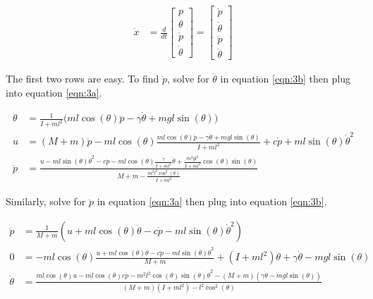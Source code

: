 \documentclass[11pt]{article}
\theoremstyle{definition}
\begin{document}
\begin{enumerate}
\begin{enumerate}
        \begin{align}
            \dot{x} &= \frac{d}{dt}\begin{bmatrix} p \\ \theta \\ \dot{p} \\ \dot{\theta} \end{bmatrix} = \begin{bmatrix} \dot{p} \\ \dot{\theta} \\ \ddot{p} \\ \ddot{\theta} \end{bmatrix}
        \end{align}

        The first two rows are easy.  To find $\ddot{p}$, solve for $\ddot{\theta}$ in equation \ref{eqn:3b} then plug into equation \ref{eqn:3a}.

        \begin{align}
            \ddot{\theta} &= \frac{1}{I + ml^2} \big( ml \cos (\theta) \ddot{p} - \gamma \dot{\theta} + mgl \sin (\theta) \big) \\
            u &= (M + m)\ddot{p} - ml \cos (\theta) \frac{ml \cos (\theta) \ddot{p} - \gamma \dot{\theta} + mgl \sin (\theta)}{I + ml^2}  + c \dot{p} + ml \sin (\theta) \dot{\theta}^2 \\
            \ddot{p} &= \frac{u - ml \sin(\theta) \dot{\theta}^2 - c \dot{p} - ml \cos(\theta) \frac{\gamma}{I + ml^2} \dot{\theta} + \frac{ m^2 g l^2}{I + ml^2} \cos (\theta) \sin (\theta)}{M + m - \frac{m^2 l^2 \cos^2 (\theta)}{I + ml^2}}
        \end{align}

        Similarly, solve for $\ddot{p}$ in equation \ref{eqn:3a} then plug into equation \ref{eqn:3b}.

        \begin{align}
            \ddot{p} &= \frac{1}{M + m} \left( u + ml \cos (\theta) \ddot{\theta} - c \dot{p} - ml \sin (\theta) \dot{\theta}^2 \right) \\
            0 &= -ml \cos (\theta) \frac{u + ml \cos (\theta) \ddot{\theta} - c \dot{p} - ml \sin (\theta) \dot{\theta}^2}{M + m}  + \left( I + ml^2 \right) \ddot{\theta} + \gamma \dot{\theta} - mgl \sin (\theta) \\
            \ddot{\theta} &= \frac{ml \cos (\theta)u - ml \cos (\theta) c \dot{p} - m^2 l^2 \cos (\theta) \sin (\theta) \dot{\theta}^2 - (M + m)(\gamma \dot{\theta} - mgl \sin (\theta))}{(M + m)(I + ml^2) - l^2 \cos^2(\theta)}
        \end{align}


\end{enumerate}
\end{enumerate}
\end{document}
